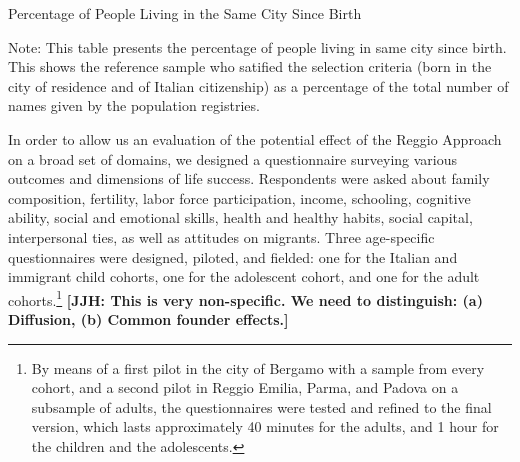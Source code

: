 \begin{table}[H]
\centering
\begin{threeparttable}
	\caption{Percentage of People Living in the Same City Since Birth}\label{tab:immigration}
	
\begin{tablenotes}
\footnotesize
Note: This table presents the percentage of people living in same city since birth. This  shows the reference sample who satified the selection criteria (born in the city of residence and of Italian citizenship) as a percentage of the total number of names given by the population registries.
\end{tablenotes}
\end{threeparttable}
\end{table}


In order to allow us an evaluation of the potential effect of the Reggio Approach on a broad set of domains, we designed a questionnaire surveying various outcomes and dimensions of life success. Respondents were asked about family composition, fertility, labor force participation, income, schooling, cognitive ability, social and emotional skills, health and healthy habits, social capital, interpersonal ties, as well as attitudes on migrants. Three age-specific questionnaires were designed, piloted, and fielded: one for the Italian and immigrant child cohorts, one for the adolescent cohort, and one for the adult cohorts.\footnote{By means of a first pilot in the city of Bergamo with a sample from every cohort, and a second pilot in Reggio Emilia, Parma, and Padova on a subsample of adults, the questionnaires were tested and refined to the final version, which lasts approximately 40 minutes for the adults, and 1 hour for the children and the adolescents.} \textbf{[JJH: This is very non-specific. We need to distinguish: (a) Diffusion, (b) Common founder effects.]}


